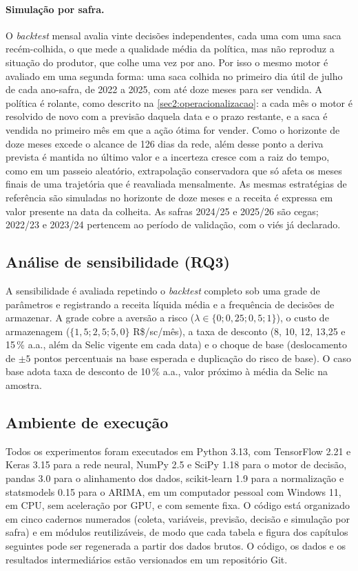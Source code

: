 \paragraph{Simulação por safra.} O \textit{backtest} mensal avalia vinte decisões independentes, cada uma com uma saca recém-colhida, o que mede a qualidade média da política, mas não reproduz a situação do produtor, que colhe uma vez por ano. Por isso o mesmo motor é avaliado em uma segunda forma: uma saca colhida no primeiro dia útil de julho de cada ano-safra, de 2022 a 2025, com até doze meses para ser vendida. A política é rolante, como descrito na \autoref{sec2:operacionalizacao}: a cada mês o motor é resolvido de novo com a previsão daquela data e o prazo restante, e a saca é vendida no primeiro mês em que a ação ótima for vender. Como o horizonte de doze meses excede o alcance de 126 dias da rede, além desse ponto a deriva prevista é mantida no último valor e a incerteza cresce com a raiz do tempo, como em um passeio aleatório, extrapolação conservadora que só afeta os meses finais de uma trajetória que é reavaliada mensalmente. As mesmas estratégias de referência são simuladas no horizonte de doze meses e a receita é expressa em valor presente na data da colheita. As safras 2024/25 e 2025/26 são cegas; 2022/23 e 2023/24 pertencem ao período de validação, com o viés já declarado.

\subsection{Análise de sensibilidade (RQ3)}

A sensibilidade é avaliada repetindo o \textit{backtest} completo sob uma grade de parâmetros e registrando a receita líquida média e a frequência de decisões de armazenar. A grade cobre a aversão a risco ($\lambda \in \{0; 0{,}25; 0{,}5; 1\}$), o custo de armazenagem ($\{1{,}5; 2{,}5; 5{,}0\}$ R\$/sc/mês), a taxa de desconto (8, 10, 12, 13,25 e 15\,\% a.a., além da Selic vigente em cada data) e o choque de base (deslocamento de $\pm 5$ pontos percentuais na base esperada e duplicação do risco de base). O caso base adota taxa de desconto de 10\,\% a.a., valor próximo à média da Selic na amostra.

\subsection{Ambiente de execução}

Todos os experimentos foram executados em Python 3.13, com TensorFlow 2.21 e Keras 3.15 para a rede neural, NumPy 2.5 e SciPy 1.18 para o motor de decisão, pandas 3.0 para o alinhamento dos dados, scikit-learn 1.9 para a normalização e statsmodels 0.15 para o ARIMA, em um computador pessoal com Windows 11, em CPU, sem aceleração por GPU, e com semente fixa. O código está organizado em cinco cadernos numerados (coleta, variáveis, previsão, decisão e simulação por safra) e em módulos reutilizáveis, de modo que cada tabela e figura dos capítulos seguintes pode ser regenerada a partir dos dados brutos. O código, os dados e os resultados intermediários estão versionados em um repositório Git.
